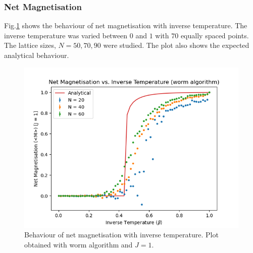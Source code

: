 \documentclass[%
reprint,
 amsmath,amssymb,
 aps,
]{revtex4-2}
\begin{document}
\subsubsection{Net Magnetisation}
Fig.\ref{fig:wormmag} shows the behaviour of net magnetisation with inverse temperature. The inverse temperature was varied between $0$ and $1$ with $70$ equally spaced points. The lattice sizes, $N = 50, 70, 90$ were studied. The plot also shows the expected analytical behaviour.
\begin{figure}[h!]
    \centering
    \includegraphics[width=\columnwidth]{worm_netmag-beta.png}
    \caption{Behaviour of net magnetisation with inverse temperature. Plot obtained with worm algorithm and $J=1$.}
    \label{fig:wormmag}
\end{figure}
\end{document}
